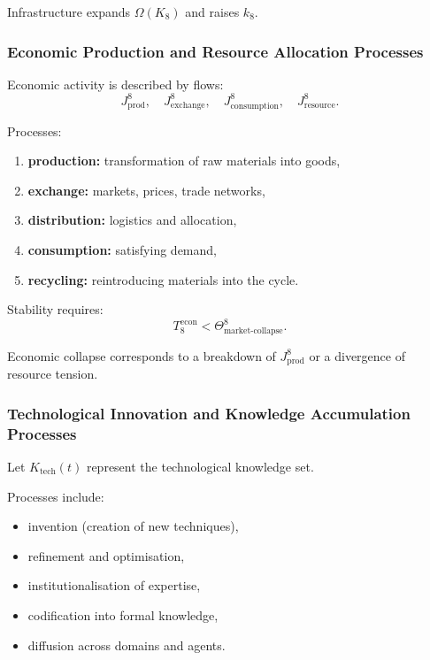 Infrastructure expands $\Omega(K_8)$ and raises $k_8$.

\subsubsection{Economic Production and Resource Allocation Processes}

Economic activity is described by flows:
\[
J^8_{\text{prod}},\quad J^8_{\text{exchange}},\quad
J^8_{\text{consumption}},\quad J^8_{\text{resource}}.
\]

Processes:
\begin{enumerate}
    \item \textbf{production:} transformation of raw materials into goods,
    \item \textbf{exchange:} markets, prices, trade networks,
    \item \textbf{distribution:} logistics and allocation,
    \item \textbf{consumption:} satisfying demand,
    \item \textbf{recycling:} reintroducing materials into the cycle.
\end{enumerate}

Stability requires:
\[
T_8^{\text{econ}} < \Theta^8_{\text{market-collapse}}.
\]

Economic collapse corresponds to a breakdown of $J^8_{\text{prod}}$ or
a divergence of resource tension.

\subsubsection{Technological Innovation and Knowledge Accumulation Processes}

Let $K_{\text{tech}}(t)$ represent the technological knowledge set.

Processes include:
\begin{itemize}
    \item invention (creation of new techniques),
    \item refinement and optimisation,
    \item institutionalisation of expertise,
    \item codification into formal knowledge,
    \item diffusion across domains and agents.
\end{itemize}


